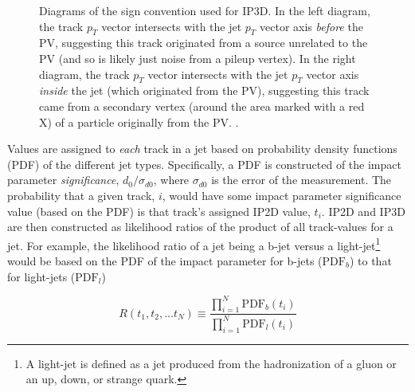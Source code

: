             \begin{figure}
                \caption{
                    Diagrams of the sign convention used for IP3D.
                    In the left diagram, the track $p_T$ vector intersects with the jet $p_T$ vector axis
                        \textit{before} the PV, suggesting this track originated from a source unrelated to the PV
                        (and so is likely just noise from a pileup vertex).
                    In the right diagram, the track $p_T$ vector intersects with the jet $p_T$ vector axis
                        \textit{inside} the jet (which originated from the PV),
                        suggesting this track came from a secondary vertex
                        (around the area marked with a red X)
                        of a particle originally from the PV.
                    \cite{thesis_giacinto}.
                }
                \label{fig:ip3d_sign}
            \end{figure}

            Values are assigned to \textit{each} track in a jet based on probability density functions (PDF) of the different jet types.
            Specifically, a PDF is constructed of the impact parameter \textit{significance}, $d_0/\sigma_{d0}$,
                where $\sigma_{d0}$ is the error of the measurement.
            The probability that a given track, $i$, would have some impact parameter significance value (based on the PDF)
                is that track's assigned IP2D value, $t_i$.
            IP2D and IP3D are then constructed as likelihood ratios of the product of all track-values for a jet.
            For example, the likelihood ratio of a jet being a b-jet versus a light-jet\footnote{
                    A light-jet is defined as a jet produced from the hadronization of a gluon or
                        an up, down, or strange quark.}
                would be based on the PDF of the impact parameter for
                b-jets ($\textrm{PDF}_b$) to that for light-jets ($\textrm{PDF}_l$)

            \begin{equation}
                R(t_1, t_2, ... t_N) \equiv \frac{\prod_{i=1}^N \textrm{PDF}_b(t_i)}{\prod_{i=1}^N \textrm{PDF}_l(t_i)}
            \end{equation}

